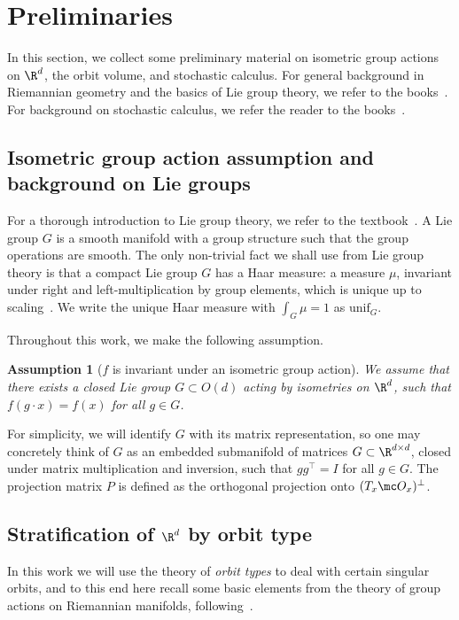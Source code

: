 \documentclass[twoside,a4paper,11pt]{article}
\theoremstyle{plain}
\newtheorem{assumption}{Assumption}
\begin{document}
\section{Preliminaries}




\label{sec:prelim}

In this section, we collect some preliminary material
on isometric group actions on $\R^d$, the orbit volume,
and stochastic calculus.
For general background in Riemannian geometry and the basics
of Lie group theory,
we refer to the books~\cite{lee2013introduction,lee2018introduction,hall2013lie}.
For background on stochastic calculus, we refer the reader
to the books~\cite{hsu2002stochastic,oksendal2013stochastic}.

\subsection{Isometric group action assumption
and background on Lie groups}
\label{subsec:group_actions}

For a thorough introduction to Lie group theory,
we refer to the textbook~\cite{hall2013lie}.
A Lie group $G$ is a smooth manifold with
a group structure such that the group operations are smooth.
The only non-trivial fact we shall use from Lie group theory
is that a compact Lie group $G$ has a Haar measure:
a measure $\mu$, invariant under right and left-multiplication
by group elements, which is unique up to scaling~\cite[Proposition 16.10]{lee2013introduction}.
We write the unique Haar measure with
$\int_G \mu = 1$ as $\mathrm{unif}_G$.

Throughout this work, we make the following assumption.
\begin{assumption}[$f$ is invariant under an isometric group action]
\label{assum:isometric}
We assume that there exists a closed Lie group $G\subset O(d)$ acting
by isometries on $\R^d$, such that $f(g\cdot x) = f(x)$ for
all $g \in G$.
\end{assumption}
For simplicity, we will identify $G$ with its matrix
representation, so one may concretely think of $G$
as an embedded submanifold of matrices $G \subset \R^{d \times d}$,
closed under matrix multiplication and inversion,
such that $gg^\top = I$ for all $g \in G$.
The projection matrix $P$ is defined as
the orthogonal projection onto $(T_x \mc O_x)^{\perp}$.





\subsection{Stratification of $\R^d$ by orbit type}
\label{subsec:stratification}
In this work we will use the theory
of {\it orbit types} to deal with
certain singular orbits, and to this
end here recall some basic
elements from the theory of group actions
on Riemannian manifolds, following~\cite[Chapter 2]{berndt2016submanifolds}.
\end{document}
